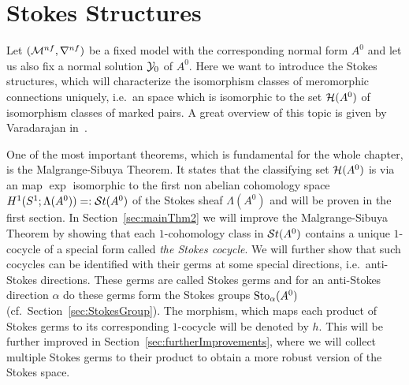 \chapter{Stokes Structures}\label{chap:stokes}
\begin{comment}
  \begin{itemize}
  \item
  Characterized completely
  \end{itemize}
\end{comment}
Let $(\mathcal{M}^{nf},\nabla^{nf})$ be a fixed model with the corresponding normal
form $A^0$ and let us also fix a normal solution $\mathcal{Y}_0$ of $A^0$.
Here we want to introduce the Stokes structures, which will characterize the
isomorphism classes of meromorphic connections uniquely, i.e.\ an space which is
isomorphic to the set $\mathcal{H}(A^0)$ of isomorphism classes of marked pairs.
A great overview of this topic is given by Varadarajan
in~\cite{Varadarajan96linearmeromorphic}.

One of the most important theorems, which is fundamental for the whole chapter,
is the Malgrange-Sibuya Theorem.
It states that the classifying set $\mathcal{H}(A^0)$ is via an map $\exp$ isomorphic
to the first non abelian cohomology space $H^1(S^1;\Lambda(A^0))=:\mathcal{S}{}t(A^0)$ of
the Stokes sheaf $\Lambda(A^0)$ and will be proven in the first section.
In Section~\ref{sec:mainThm2} we will improve the Malgrange-Sibuya Theorem by
showing that each $1$-cohomology class in $\mathcal{S}{}t(A^0)$ contains a unique
$1$-cocycle of a special form called \emph{the Stokes cocycle}.
We will further show that such cocycles can be identified with their germs at
some special directions, i.e.\ anti-Stokes directions. These germs are called
Stokes germs and for an anti-Stokes direction $\alpha$ do these germs form the
Stokes groups $\operatorname{Sto}_\alpha(A^0)$ (cf.\ Section~\ref{sec:StokesGroup}).
The morphism, which maps each product of Stokes germs to its corresponding
$1$-cocycle will be denoted by $h$.
This will be further improved in Section~\ref{sec:furtherImprovements}, where we
will collect multiple Stokes germs to their product to obtain a more robust
version of the Stokes space.

